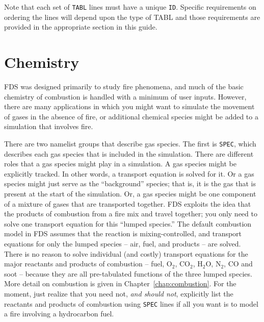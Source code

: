 \documentclass[11pt]{book}
\newcommand{\ct}{\tt\small}
\begin{document}
\begin{warning}
\noindent
Note that each set of {\ct TABL} lines must have a unique {\ct ID}.  Specific requirements on ordering the lines
will depend upon the type of TABL and those requirements are provided in the appropriate section in this guide.
\end{warning}





\chapter{Chemistry}
\label{info:Chemistry}

FDS was designed primarily to study fire phenomena, and much of the basic chemistry of combustion is handled with a minimum of user inputs. However, there
are many applications in which you might want to simulate the movement of gases in the absence of fire, or additional chemical species might be added to a simulation that
involves fire.

There are two namelist groups that describe gas species. The first is {\ct SPEC}, which describes each gas species that is included in the simulation. There are
different roles that a gas species might play in a simulation. A gas
species might be explicitly tracked. In other words, a transport equation is solved for it. Or a gas species might just serve as the ``background'' species; that is, it is
the gas that is present at the start of the simulation. Or, a gas species might be one component of a mixture of
gases that are transported together. FDS exploits the idea that the products of combustion from a fire mix and travel together; you only need to solve
one transport equation for this ``lumped species.'' The default combustion model in FDS assumes that the reaction is mixing-controlled, and
transport equations for only the lumped species -- air, fuel, and products -- are solved.  There is no reason to solve individual (and costly) transport equations
for the major reactants and products of combustion -- fuel, O$_2$, CO$_2$,
H$_2$O, N$_2$, CO and soot -- because they are all pre-tabulated functions of
the three lumped species. More detail on combustion is given in Chapter~\ref{chap:combustion}. For the moment, just realize that you need not, {\em and should not},
explicitly list the reactants and products of combustion using {\ct SPEC} lines if all you want is to model a fire involving a hydrocarbon fuel.
\end{document}
